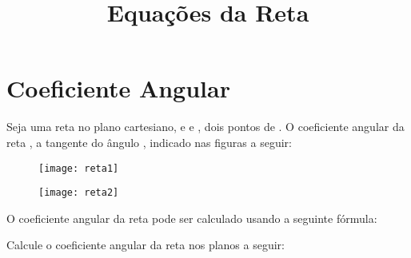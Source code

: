 \documentclass[oneside,a4paper,12pt]{article}
\title{\textbf{Equações da Reta}}
\begin{document}
\maketitle

\section{Coeficiente Angular}

Seja uma reta  no plano cartesiano, e  e , dois pontos de . O coeficiente angular da reta , a tangente do ângulo \m{\alpha}, indicado nas figuras a seguir:

\begin{figure}[!htb]
\center
\begin{multicols}{2}
\texttt{[image: reta1]}
\caption{}
\texttt{[image: reta2]}
\caption{}
\end{multicols}
\end{figure}

\noindent O coeficiente angular da reta pode ser calculado usando a seguinte fórmula:


\begin{exemplo}
Calcule o coeficiente angular da reta  nos planos a seguir:
\end{exemplo}
\end{document}
